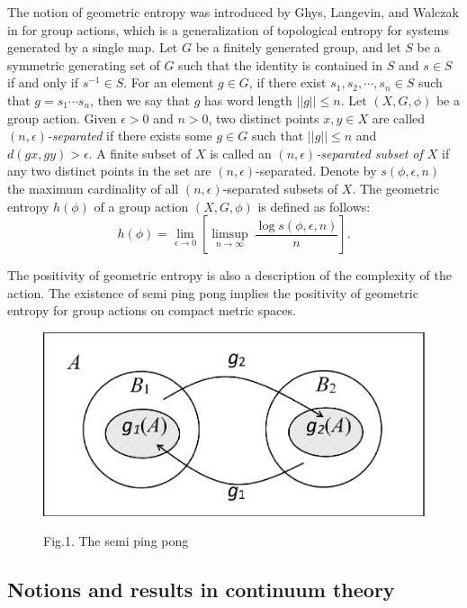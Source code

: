 \documentclass[12pt,a4paper]{amsart}
\theoremstyle{definition}
\numberwithin{equation}{section}
\begin{document}
The notion of geometric entropy was introduced
by Ghys, Langevin, and Walczak in \cite{GLW} for group actions, which is a generalization of topological entropy for systems generated by a single map. Let $G$ be a finitely generated group, and let $S$ be a symmetric generating set of $G$ such that the identity is contained in $S$ and $s\in S$ if and only if $s^{-1}\in S$. For an element $g\in G$, if there exist $s_1,s_2,\cdots, s_n\in S$ such that $g=s_1\cdots s_n$, then we say that $g$ has word length $||g||\leq n$. Let $(X,G,\phi)$ be a group action. Given $\epsilon>0$ and $n>0$, two distinct points $x,y\in X$ are called {\it $(n,\epsilon)$-separated} if there exists some $g\in G$ such that $||g||\leq n$ and $d(gx,gy)>\epsilon$. A finite subset of $X$ is called an {\it $(n,\epsilon)$-separated subset of $X$} if any two distinct points in the set are $(n,\epsilon)$-separated. Denote by $s(\phi, \epsilon,n)$ the maximum cardinality of all $(n,\epsilon)$-separated subsets of $X$. The geometric entropy $h(\phi)$ of a group action $(X,G,\phi)$ is defined as follows:
$$h(\phi)=\lim_{\epsilon\to 0} \left[\limsup_{n\to\infty}\ \frac{\log s(\phi,\epsilon,n)}{n}\right].$$

The positivity of geometric entropy  is also a description of the complexity of the action. The existence of semi ping pong implies
the positivity of geometric entropy  for group actions on compact metric spaces.

\begin{figure}%
\centering
\includegraphics[scale=0.5]{semi-ping-pong.pdf}
\centerline{Fig.1. The semi ping pong}
\end{figure}


\subsection{Notions and results in continuum theory}
\end{document}
